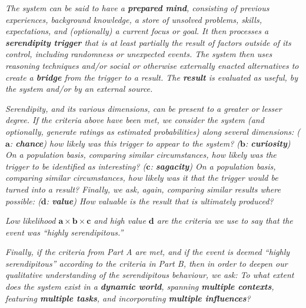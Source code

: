 \begin{description}[itemsep=4pt]
\item[\emph{(\textbf{A - Definitional characteristics})}] \emph{The
  system can be said to have a \emph{\textbf{prepared mind}},
  consisting of previous experiences, background knowledge, a store of
  unsolved problems, skills, expectations, and (optionally) a current
  focus or goal.  It then processes a \emph{\textbf{serendipity
  trigger}} that is at least partially the result of factors outside
  of its control, including randomness or unexpected events.  The
  system then uses reasoning techniques and/or social or otherwise
  externally enacted alternatives to create a \emph{\textbf{bridge}}
  from the trigger to a result.  The \emph{\textbf{result}} is
  evaluated as useful, by the system and/or by an external source.}
\item[\emph{(\textbf{B - Dimensions})}] \emph{Serendipity, and its
  various dimensions, can be present to a greater or lesser degree.
  If the criteria above have been met, we consider the system (and optionally, generate ratings as
  estimated probabilities) along several dimensions:
%
\emph{($\mathbf{a}$: \textbf{chance})} how likely was this trigger to appear to
  the system?
%
\emph{($\mathbf{b}$: \textbf{curiosity})} On a population basis, comparing
  similar circumstances, how likely was the trigger to be identified
  as interesting?
%
\emph{($\mathbf{c}$: \textbf{sagacity})} On a population basis, comparing
  similar circumstances, how likely was it that the trigger
  would be turned into a result?
%
Finally, we ask, again, comparing similar results where possible:
\emph{($\mathbf{d}$: \textbf{value})} How valuable is the result that
is ultimately produced?}

\medskip


\emph{Low likelihood $\mathbf{a}\times\mathbf{b}\times\mathbf{c}$ 
 and high value $\mathbf{d}$ are the criteria we use to say that the event was ``highly serendipitous.''}

\item[\emph{(\textbf{C - Factors})}] \emph{Finally, if the criteria
  from Part A are met, and if the event is deemed ``highly
  serendipitous'' according to the criteria in Part B, then in order
  to deepen our qualitative understanding of the serendipitous
  behaviour, we ask: To what extent does the system exist in a
  \emph{\textbf{dynamic world}}, spanning \emph{\textbf{multiple
      contexts}}, featuring \emph{\textbf{multiple tasks}}, and
  incorporating \emph{\textbf{multiple influences}}?}
\end{description}

